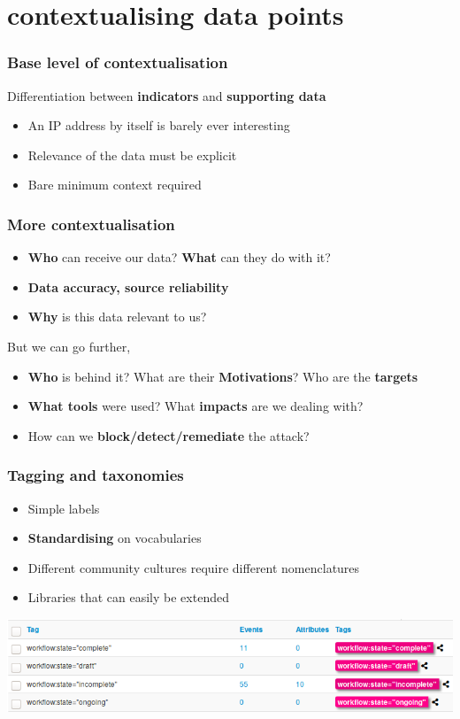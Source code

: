 \section{contextualising data points}

\begin{frame}
\frametitle{Base level of contextualisation}
{\centering Differentiation between {\bf indicators} and {\bf supporting data}}
\begin{itemize}
       \item An IP address by itself is barely ever interesting
       \item Relevance of the data must be explicit
       \item Bare minimum context required
\end{itemize}
\end{frame}

\begin{frame}
\frametitle{More contextualisation}
\begin{itemize}
    \item {\bf Who} can receive our data? {\bf What} can they do with it?
    \item {\bf Data accuracy, source reliability}
    \item {\bf Why} is this data relevant to us?
\end{itemize}
\vspace{1em}
But we can go further,

\pause
\begin{itemize}
    \item {\bf Who} is behind it? What are their {\bf Motivations}? Who are the {\bf targets}
    \item {\bf What tools} were used? What {\bf impacts} are we dealing with?
    \item How can we {\bf block/detect/remediate} the attack?
\end{itemize}
\end{frame}

\begin{frame}
\frametitle{Tagging and taxonomies}
\begin{itemize}
       \item Simple labels
       \item {\bf Standardising} on vocabularies
       \item Different community cultures require different nomenclatures
       \item Libraries that can easily be extended
\end{itemize}
\vspace{1em}
\includegraphics[width=1.0\linewidth]{pics/taxonomy-workflow.png}
\end{frame}

